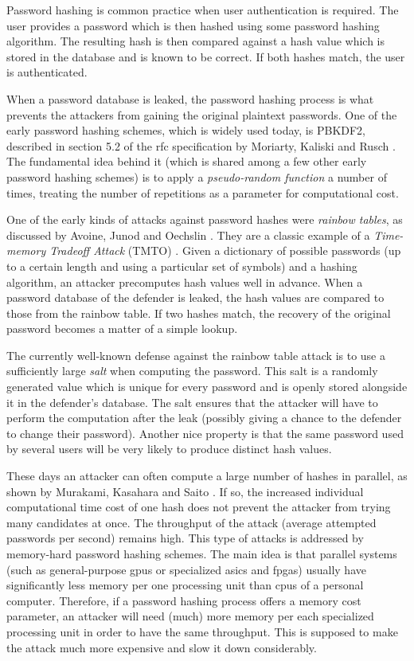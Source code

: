 Password hashing is common practice when user authentication is required. The user provides a password which is then hashed using some password hashing algorithm. The resulting hash is then compared against a hash value which is stored in the database and is known to be correct. If both hashes match, the user is authenticated.

When a password database is leaked, the password hashing process is what prevents the attackers from gaining the original plaintext passwords. One of the early password hashing schemes, which is widely used today, is PBKDF2, described in section 5.2 of the \gls{rfc} specification by Moriarty, Kaliski and Rusch \cite{moriarty:2017:pkcs}. The fundamental idea behind it (which is shared among a few other early password hashing schemes) is to apply a \emph{pseudo-random function} a number of times, treating the number of repetitions as a parameter for computational cost.

One of the early kinds of attacks against password hashes were \emph{rainbow tables}, as discussed by Avoine, Junod and Oechslin \cite{Avoine:2008:CIT:1380564.1380565}. They are a classic example of a \emph{Time-memory Tradeoff Attack} (TMTO) \cite{Avoine:2008:CIT:1380564.1380565}. Given a dictionary of possible passwords (up to a certain length and using a particular set of symbols) and a hashing algorithm, an attacker precomputes hash values well in advance. When a password database of the defender is leaked, the hash values are compared to those from the rainbow table. If two hashes match, the recovery of the original password becomes a matter of a simple lookup.

The currently well-known defense against the rainbow table attack is to use a sufficiently large \emph{salt} when computing the password. This salt is a randomly generated value which is unique for every password and is openly stored alongside it in the defender's database. The salt ensures that the attacker will have to perform the computation after the leak (possibly giving a chance to the defender to change their password). Another nice property is that the same password used by several users will be very likely to produce distinct hash values.

These days an attacker can often compute a large number of hashes in parallel, as shown by Murakami, Kasahara and Saito \cite{5665047}. If so, the increased individual computational time cost of one hash does not prevent the attacker from trying many candidates at once. The throughput of the attack (average attempted passwords per second) remains high. This type of attacks is addressed by memory-hard password hashing schemes. The main idea is that parallel systems (such as general-purpose \gls{gpus} or specialized \gls{asics} and \gls{fpgas}) usually have significantly less memory per one processing unit than \gls{cpus} of a personal computer. Therefore, if a password hashing process offers a memory cost parameter, an attacker will need (much) more memory per each specialized processing unit in order to have the same throughput. This is supposed to make the attack much more expensive and slow it down considerably.

